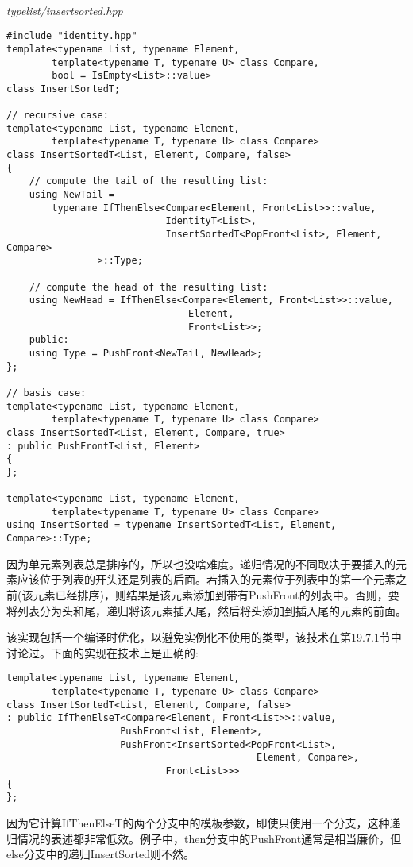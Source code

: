 \hspace*{\fill} \\ %
\noindent
\textit{typelist/insertsorted.hpp}
\begin{lstlisting}[style=styleCXX]
#include "identity.hpp"
template<typename List, typename Element,
		template<typename T, typename U> class Compare,
		bool = IsEmpty<List>::value>
class InsertSortedT;

// recursive case:
template<typename List, typename Element,
		template<typename T, typename U> class Compare>
class InsertSortedT<List, Element, Compare, false>
{
	// compute the tail of the resulting list:
	using NewTail =
		typename IfThenElse<Compare<Element, Front<List>>::value,
							IdentityT<List>,
							InsertSortedT<PopFront<List>, Element, Compare>
				>::Type;
				
	// compute the head of the resulting list:
	using NewHead = IfThenElse<Compare<Element, Front<List>>::value,
								Element,
								Front<List>>;
	public:
	using Type = PushFront<NewTail, NewHead>;
};

// basis case:
template<typename List, typename Element,
		template<typename T, typename U> class Compare>
class InsertSortedT<List, Element, Compare, true>
: public PushFrontT<List, Element>
{
};

template<typename List, typename Element,
		template<typename T, typename U> class Compare>
using InsertSorted = typename InsertSortedT<List, Element, Compare>::Type;
\end{lstlisting}

因为单元素列表总是排序的，所以也没啥难度。递归情况的不同取决于要插入的元素应该位于列表的开头还是列表的后面。若插入的元素位于列表中的第一个元素之前(该元素已经排序)，则结果是该元素添加到带有PushFront的列表中。否则，要将列表分为头和尾，递归将该元素插入尾，然后将头添加到插入尾的元素的前面。

该实现包括一个编译时优化，以避免实例化不使用的类型，该技术在第19.7.1节中讨论过。下面的实现在技术上是正确的:

\begin{lstlisting}[style=styleCXX]
template<typename List, typename Element,
		template<typename T, typename U> class Compare>
class InsertSortedT<List, Element, Compare, false>
: public IfThenElseT<Compare<Element, Front<List>>::value,
					PushFront<List, Element>,
					PushFront<InsertSorted<PopFront<List>,
											Element, Compare>,
							Front<List>>>
{
};
\end{lstlisting}

因为它计算IfThenElseT的两个分支中的模板参数，即使只使用一个分支，这种递归情况的表述都非常低效。例子中，then分支中的PushFront通常是相当廉价，但else分支中的递归InsertSorted则不然。

